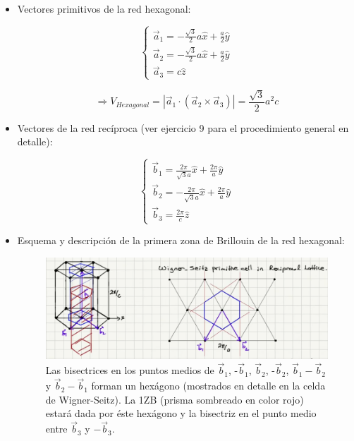 \documentclass[a4paper]{article}
\begin{document}
\begin{itemize}
\item Vectores primitivos de la red hexagonal:

$$\begin{cases}
\vec{a}_{1} = - \frac{\sqrt{3}}{2}a\hat{x} + \frac{a}{2}\hat{y} \\
\vec{a}_{2} = - \frac{\sqrt{3}}{2}a\hat{x} + \frac{a}{2}\hat{y} \\
\vec{a}_{3} = c\hat{z}
\end{cases}$$

$$\Rightarrow V_{Hexagonal} = | \vec{a}_{1} \cdot (\vec{a}_{2} \times \vec{a}_{3})| = \frac{\sqrt{3}}{2}a^{2}c$$

\item Vectores de la red rec\'iproca (ver ejercicio 9 para el procedimiento general en detalle):

$$\begin{cases}
\vec{b}_{1} = \frac{2 \pi}{\sqrt{3}a}\hat{x} + \frac{2 \pi}{a}\hat{y} \\
\vec{b}_{2} = - \frac{2 \pi}{\sqrt{3}a}\hat{x} + \frac{2 \pi}{a}\hat{y} \\
\vec{b}_{3} = \frac{2 \pi}{c}\hat{z}
\end{cases}$$

\item Esquema y descripci\'on de la primera zona de Brillouin de la red hexagonal:

\begin{figure}[H]
  \centering
  \includegraphics[width=0.9\linewidth,height=0.5\linewidth]{pzb_hex.png}
  \caption{Las bisectrices en los puntos medios de $\vec{b}_{1}$, -$\vec{b}_{1}$, $\vec{b}_{2}$, -$\vec{b}_{2}$, $\vec{b}_{1} - \vec{b}_{2}$ y $\vec{b}_{2} - \vec{b}_{1}$ forman un hex\'agono (mostrados en detalle en la celda de Wigner-Seitz). La 1ZB (prisma sombreado en color rojo) estar\'a dada por \'este hex\'agono y la bisectriz en el punto medio entre $\vec{b}_{3}$ y $-\vec{b}_{3}$.}
  \label{fig:pzb_hex}
\end{figure}

\end{itemize}
\end{document}

